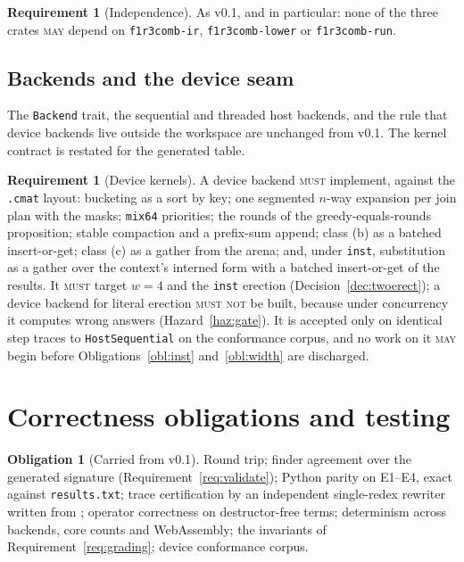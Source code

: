 \documentclass[11pt,a4paper]{article}
\newcommand{\code}[1]{\texttt{#1}}
\newcommand{\MUST}{\textsc{must}}
\newcommand{\MUSTNOT}{\textsc{must not}}
\newcommand{\MAY}{\textsc{may}}
\theoremstyle{definition}
\newtheorem{requirement}[definition]{Requirement}
\newtheorem{obligation}[definition]{Obligation}
\theoremstyle{plain}
\begin{document}
\begin{requirement}[Independence]\label{req:indep}
As v0.1, and in particular: none of the three crates \MAY{} depend on
\code{f1r3comb-ir}, \code{f1r3comb-lower} or \code{f1r3comb-run}.
\end{requirement}

\subsection{Backends and the device seam}\label{sec:device}

The \code{Backend} trait, the sequential and threaded host backends, and the
rule that device backends live outside the workspace are unchanged from v0.1.
The kernel contract is restated for the generated table.

\begin{requirement}[Device kernels]\label{req:device}
A device backend \MUST{} implement, against the \code{.cmat} layout: bucketing
as a sort by key; one segmented $n$-way expansion per join plan with the
masks; \code{mix64} priorities; the rounds of the greedy-equals-rounds
proposition; stable compaction and a prefix-sum append; class (b) as a batched
insert-or-get; class (c) as a gather from the arena; and, under \code{inst},
substitution as a gather over the context's interned form with a batched
insert-or-get of the results. It \MUST{} target $w = 4$ and the \code{inst}
erection (Decision~\ref{dec:twoerect}); a device backend for literal erection
\MUSTNOT{} be built, because under concurrency it computes wrong answers
(Hazard~\ref{haz:gate}). It is accepted only on identical step traces to
\code{HostSequential} on the conformance corpus, and no work on it \MAY{}
begin before Obligations~\ref{obl:inst} and~\ref{obl:width} are discharged.
\end{requirement}

\section{Correctness obligations and testing}\label{sec:test}

\begin{obligation}[Carried from v0.1]\label{obl:carried}
Round trip; finder agreement over the generated signature
(Requirement~\ref{req:validate}); Python parity on E1--E4, exact against
\code{results.txt}; trace certification by an independent single-redex
rewriter written from \cite[Def.~4.4]{combspec}; operator correctness on
destructor-free terms; determinism across backends, core counts and
WebAssembly; the invariants of Requirement~\ref{req:grading}; device
conformance corpus.
\end{obligation}
\end{document}
